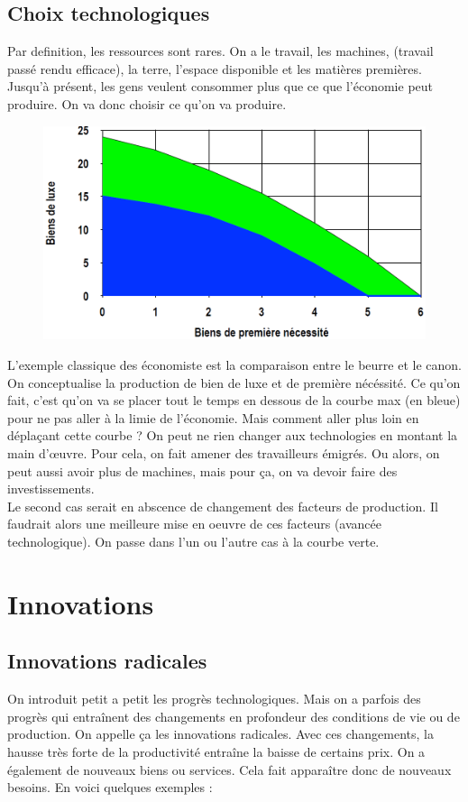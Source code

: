 \subsection{Choix technologiques}
Par definition, les ressources sont rares. On a le travail, les machines, (travail passé rendu efficace), la terre, l'espace disponible et les matières premières. Jusqu'à présent, les gens veulent consommer plus que ce que l'économie peut produire. On va donc choisir ce qu'on va produire. 

\begin{figure}
	\includegraphics[scale=0.3]{59}
\end{figure}
L'exemple classique des économiste est la comparaison entre le beurre et le canon. On conceptualise la production de bien de luxe et de première nécéssité. Ce qu'on fait, c'est qu'on va se placer tout le temps en dessous de la courbe max (en bleue) pour ne pas aller à la limie de l'économie. Mais comment aller plus loin en déplaçant cette courbe ? On peut ne rien changer aux technologies en montant la main d'œuvre. Pour cela, on fait amener des travailleurs émigrés. Ou alors, on peut aussi avoir plus de machines, mais pour ça, on va devoir faire des investissements. \\
Le second cas serait en abscence de changement des facteurs de production. Il faudrait alors une meilleure mise en oeuvre de ces facteurs (avancée technologique). On passe dans l'un ou l'autre cas à la courbe verte. 

\section{Innovations}
\subsection{Innovations radicales}
On introduit petit a petit les progrès technologiques. Mais on a parfois des progrès qui entraînent des changements en profondeur des conditions de vie ou de production. On appelle ça les innovations radicales. Avec ces changements, la hausse très forte de la productivité entraîne la baisse de certains prix. On a également de nouveaux biens ou services. Cela fait apparaître donc de nouveaux besoins. En voici quelques exemples : 

